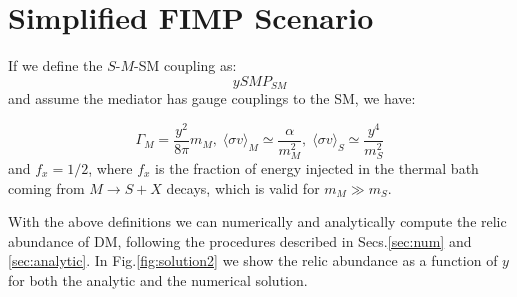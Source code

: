 \documentclass{article}
\def\to{\rightarrow}
\def\be{\begin{equation}}
\def\ee{\end{equation}}
\def\to{\rightarrow}
\begin{document}
\section{Simplified FIMP Scenario} \label{sec:simp}

If we define the $S$-$M$-SM coupling as:
\be
y S M P_{SM}
\ee
and assume the mediator has gauge couplings to the SM, we have:

\be
\Gamma_M  = \frac{y^2}{8 \pi} m_M, \; \langle \sigma v \rangle_M  \simeq \frac{\alpha}{m_M^2}, \; \langle \sigma v \rangle_S  \simeq \frac{y^4}{m_S^2}
\ee
and $f_x = 1/2$, where $f_x$ is the fraction of energy injected in the thermal bath coming from $M \to S + X$ decays, which
is valid for $m_M \gg m_S$.

With the above definitions we can numerically and analytically compute the relic abundance
of DM, following the procedures described in Secs.\ref{sec:num} and \ref{sec:analytic}.
In Fig.\ref{fig:solution2}  we show the relic abundance as a function of $y$ for both the
analytic and the numerical solution.
\end{document}
